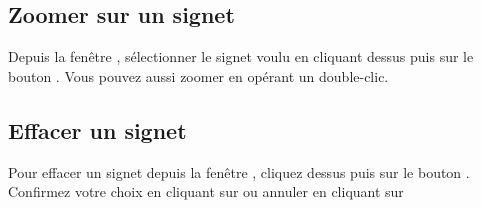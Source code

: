 \subsection{Zoomer sur un signet}
Depuis la fenêtre , sélectionner le signet voulu en cliquant dessus puis sur le bouton . Vous pouvez aussi zoomer en opérant un double-clic.

\subsection{Effacer un signet}
Pour effacer un signet depuis la fenêtre , cliquez dessus puis sur le bouton .
Confirmez votre choix en cliquant sur  ou annuler en cliquant sur 
